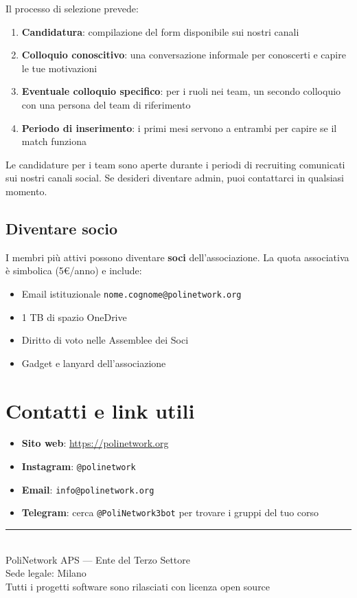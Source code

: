 \documentclass[11pt,a4paper]{article}
\begin{document}
Il processo di selezione prevede:
\begin{enumerate}[leftmargin=2em]
    \item \textbf{Candidatura}: compilazione del form disponibile
          sui nostri canali
    \item \textbf{Colloquio conoscitivo}: una conversazione informale
          per conoscerti e capire le tue motivazioni
    \item \textbf{Eventuale colloquio specifico}: per i ruoli nei
          team, un secondo colloquio con una persona del team
          di riferimento
    \item \textbf{Periodo di inserimento}: i primi mesi servono a
          entrambi per capire se il match funziona
\end{enumerate}

Le candidature per i team sono aperte durante i periodi di
recruiting comunicati sui nostri canali social. Se desideri
diventare admin, puoi contattarci in qualsiasi momento.

\subsection{Diventare socio}

I membri più attivi possono diventare \textbf{soci} dell'associazione.
La quota associativa è simbolica (5\euro{}/anno) e include:
\begin{itemize}[leftmargin=2em]
    \item Email istituzionale \texttt{nome.cognome@polinetwork.org}
    \item 1 TB di spazio OneDrive
    \item Diritto di voto nelle Assemblee dei Soci
    \item Gadget e lanyard dell'associazione
\end{itemize}

\section{Contatti e link utili}

\begin{itemize}[leftmargin=2em]
    \item \textbf{Sito web}: \url{https://polinetwork.org}
    \item \textbf{Instagram}: \texttt{@polinetwork}
    \item \textbf{Email}: \texttt{info@polinetwork.org}
    \item \textbf{Telegram}: cerca \texttt{@PoliNetwork3bot} per
          trovare i gruppi del tuo corso
\end{itemize}

\vspace{2em}

\begin{center}
    \rule{0.3\textwidth}{0.5pt}\\[1em]
    \textcolor{pngray}{\small PoliNetwork APS — Ente del Terzo Settore}\\
    \textcolor{pngray}{\small Sede legale: Milano}\\
    \textcolor{pngray}{\small Tutti i progetti software sono rilasciati con licenza open source}
\end{center}
\end{document}

